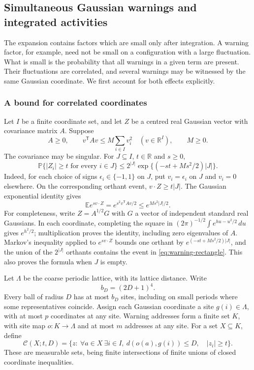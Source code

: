\subsection{Simultaneous Gaussian warnings and integrated activities}
\label{sec:gaussian-warnings}

The expansion contains factors which are small only after integration.
A warning factor, for example, need not be small on a configuration
with a large fluctuation. What is small is the probability that all
warnings in a given term are present. Their fluctuations are correlated,
and several warnings may be witnessed by the same Gaussian coordinate.
We first account for both effects explicitly.

\subsubsection{A bound for correlated coordinates}
Let $I$ be a finite coordinate set, and let $Z$ be a centred real Gaussian
vector with covariance matrix $A$. Suppose
\begin{equation}\label{eq:warning-covariance}
 A\ge0,\qquad v^{\mathsf T}Av\le M\sum_{i\in I}v_i^2
 \quad(v\in\mathbb R^I),\qquad M\ge0.
\end{equation}
The covariance may be singular. For $J\subseteq I$, $t\in\mathbb R$
and $s\ge0$,
\begin{equation}\label{eq:warning-rectangle}
 \mathbb P\{|Z_i|\ge t\text{ for every }i\in J\}
 \le 2^{|J|}\exp\{(-st+Ms^2/2)|J|\}.
\end{equation}
Indeed, for each choice of signs $\epsilon_i\in\{-1,1\}$ on $J$, put
$v_i=\epsilon_i$ on $J$ and $v_i=0$ elsewhere. On the corresponding
orthant event, $v\cdot Z\ge t|J|$. The Gaussian exponential identity gives
\[
 \mathbb E e^{s v\cdot Z}
 =e^{s^2v^{\mathsf T}Av/2}
 \le e^{Ms^2|J|/2}.
\]
For completeness, write $Z=A^{1/2}G$ with $G$ a vector of independent
standard real Gaussians. In each coordinate, completing the square in
$(2\pi)^{-1/2}\int e^{hu-u^2/2}\,du$ gives $e^{h^2/2}$;
multiplication proves the identity, including zero eigenvalues of $A$.
Markov's inequality applied to $e^{s v\cdot Z}$ bounds one orthant by
$e^{(-st+Ms^2/2)|J|}$, and the union of the $2^{|J|}$ orthants contains
the event in \eqref{eq:warning-rectangle}. This also proves the formula
when $J$ is empty.

Let $\Lambda$ be the coarse periodic lattice, with its lattice distance.
Write
\[
 b_D=(2D+1)^4.
\]
Every ball of radius $D$ has at most $b_D$ sites, including on small
periods where some representatives coincide. Assign each Gaussian
coordinate a site $g(i)\in\Lambda$, with at most $p$ coordinates at any
site. Warning addresses form a finite set $K$, with site map
$o:K\to\Lambda$ and at most $m$ addresses at any site. For a set
$X\subseteq K$, define
\[
 \mathcal C(X;t,D)=
 \{z:\ \forall a\in X\ \exists i\in I,
       \ d(o(a),g(i))\le D,\quad |z_i|\ge t\}.
\]
These are measurable sets, being finite intersections of finite unions
of closed coordinate inequalities.

